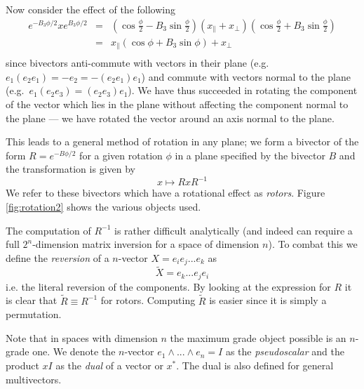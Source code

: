 Now consider the effect of the following
\begin{eqnarray*}
e^{-B_3\phi/2}
x
e^{B_3\phi/2}
& = & \left(\cos \frac{\phi}{2} - B_3 \sin \frac{\phi}{2}\right)
(x_\parallel + x_\perp )
\left(\cos \frac{\phi}{2} + B_3 \sin \frac{\phi}{2}\right) \\
& = & x_\parallel (\cos \phi + B_3 \sin \phi) + x_\perp\\ 
\end{eqnarray*}
since bivectors anti-commute with vectors in their plane (e.g. 
$e_1(e_2e_1) = -e_2 = -(e_2e_1)e_1$) and commute with
vectors normal to the plane (e.g.\ $e_1(e_2e_3) = (e_2e_3)e_1$).
We have thus succeeded in rotating the component of the vector 
which lies in the plane without affecting the component normal
to the plane --- we have rotated the vector around an axis normal to
the plane.


This leads to a general method of rotation in any plane; we
form a bivector of the form $R = e^{-B\phi/2}$ for a given rotation 
$\phi$ in a plane specified by the bivector $B$ and the transformation
is given by
\begin{displaymath}
x \mapsto RxR^{-1}
\end{displaymath}
We refer to these bivectors which have a rotational effect as \emph{rotors}.
Figure \ref{fig:rotation2} shows the various objects used.

The computation of $R^{-1}$ is rather difficult analytically (and indeed can
require a full $2^n$-dimension matrix inversion for a space of
dimension $n$). To combat this we define
the \emph{reversion} of a $n$-vector $X = e_ie_j...e_k$ as
\[
\tilde{X} = e_k...e_je_i
\]
i.e. the literal reversion of the components. By looking at the expression for
$R$ it is clear that $\tilde{R} \equiv R^{-1}$ for rotors. Computing $\tilde{R}$
is easier since it is simply a permutation.

Note that in spaces with dimension $n$ the maximum grade object 
possible is an $n$-grade
one. We denote the $n$-vector $e_1 \wedge ... \wedge e_n = I$ as the \emph{pseudoscalar}
and the product $xI$ as the \emph{dual} of a vector or $x^*$. The dual is also defined
for general multivectors.

